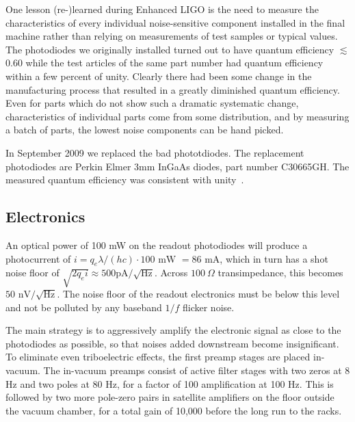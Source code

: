 One lesson (re-)learned during Enhanced LIGO is the need to measure
the characteristics of every individual noise-sensitive component
installed in the final machine rather than relying on measurements of
test samples or typical values.  The photodiodes we originally
installed turned out to have quantum efficiency $\lesssim$ 0.60 while
the test articles of the same part number had quantum efficiency
within a few percent of unity.  Clearly there had been some change in
the manufacturing process that resulted in a greatly diminished
quantum efficiency.  Even for parts which do not show such a dramatic
systematic change, characteristics of individual parts come from some
distribution, and by measuring a batch of parts, the lowest noise
components can be hand picked.

In September 2009 we replaced the bad phototdiodes.  The replacement
photodiodes are Perkin Elmer 3mm InGaAs diodes, part number C30665GH.
The measured quantum efficiency was consistent with unity~\cite{Rollins2009H1}.

\subsection{Electronics}
An optical power of 100 mW on the readout photodiodes will produce a
photocurrent of $i = q_e\lambda/(hc)\cdot 100\text{ mW } = 86\text{ mA}$, which
in turn has a shot noise floor of $\sqrt{2 q_e i}\approx 500 \text{
  pA}/\sqrt{\text{Hz}}$.  Across $100\ \Omega$ transimpedance, this becomes $50
\text{ nV}/\sqrt{\text{Hz}}$.  The noise floor of the readout electronics must
be below this level and not be polluted by any baseband $1/f$ flicker noise.

The main strategy is to aggressively amplify the electronic signal as close to
the photodiodes as possible, so that noises added downstream become
insignificant.  To eliminate even triboelectric effects, the first preamp stages
are placed in-vacuum.  The in-vacuum preamps consist of active filter stages
with two zeros at 8 Hz and two poles at 80 Hz, for a factor of 100 amplification
at 100 Hz.  This is followed by two more pole-zero pairs in satellite amplifiers
on the floor outside the vacuum chamber, for a total gain of 10,000 before the
long run to the racks.

